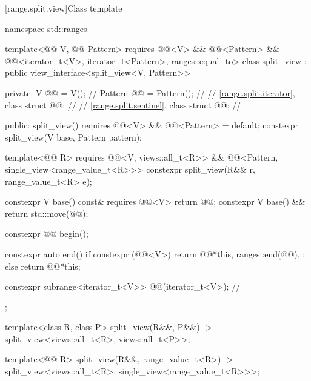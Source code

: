 [range.split.view]{Class template }

\begin{codeblock}
namespace std::ranges {
  template<@@ V, @@ Pattern>
    requires @@<V> && @@<Pattern> &&
             @@<iterator_t<V>, iterator_t<Pattern>, ranges::equal_to>
  class split_view : public view_interface<split_view<V, Pattern>> {
  private:
    V @@ = V();                              // \expos
    Pattern @@ = Pattern();               // \expos
    // \ref{range.split.iterator}, class 
    struct @@;                            // \expos
    // \ref{range.split.sentinel}, class 
    struct @@;                            // \expos

  public:
    split_view()
      requires @@<V> && @@<Pattern> = default;
    constexpr split_view(V base, Pattern pattern);

    template<@@ R>
      requires @@<V, views::all_t<R>> &&
               @@<Pattern, single_view<range_value_t<R>>>
    constexpr split_view(R&& r, range_value_t<R> e);

    constexpr V base() const& requires @@<V> { return @@; }
    constexpr V base() && { return std::move(@@); }

    constexpr @@ begin();

    constexpr auto end() {
      if constexpr (@@<V>) {
        return @@{*this, ranges::end(@@), {}};
      } else {
        return @@{*this};
      }
    }

    constexpr subrange<iterator_t<V>> @@(iterator_t<V>); // \expos
  };

  template<class R, class P>
    split_view(R&&, P&&) -> split_view<views::all_t<R>, views::all_t<P>>;

  template<@@ R>
    split_view(R&&, range_value_t<R>)
      -> split_view<views::all_t<R>, single_view<range_value_t<R>>>;
}
\end{codeblock}

